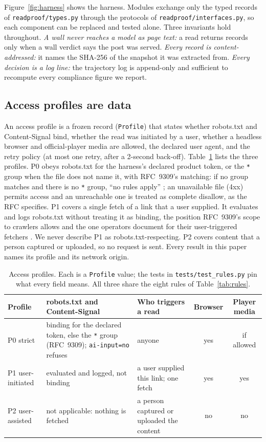 \documentclass[11pt]{article}
\begin{document}
Figure~\ref{fig:harness} shows the harness. Modules exchange only the typed records of
\texttt{readproof/types.py} through the protocols of \texttt{readproof/interfaces.py}, so each component can
be replaced and tested alone. Three invariants hold throughout. \emph{A wall never reaches a model as page
text:} a read returns records only when a wall verdict says the post was served. \emph{Every record is
content-addressed:} it names the SHA-256 of the snapshot it was extracted from. \emph{Every decision is a log
line:} the trajectory log is append-only and sufficient to recompute every compliance figure we report.

\subsection{Access profiles are data}\label{sec:profiles}
An access profile is a frozen record (\texttt{Profile}) that states whether robots.txt and Content-Signal
bind, whether the read was initiated by a user, whether a headless browser and official-player media are
allowed, the declared user agent, and the retry policy (at most one retry, after a 2-second back-off).
Table~\ref{tab:profiles} lists the three profiles. P0 obeys robots.txt for the harness's declared product
token, or the \texttt{*} group when the file does not name it, with RFC~9309's matching: if no group matches
and there is no \texttt{*} group, ``no rules apply'' \citep{rfc9309}; an unavailable file (4xx) permits access
and an unreachable one is treated as complete disallow, as the RFC specifies. P1 covers a single fetch of a
link that a user supplied. It evaluates and logs robots.txt without treating it as binding, the position
RFC~9309's scope to crawlers allows and the one operators document for their user-triggered fetchers
\citep{openai2026crawlers,tollbit2026googleagent}. We never describe P1 as robots.txt-respecting. P2 covers
content that a person captured or uploaded, so no request is sent. Every result in this paper names its
profile and its network origin.

\begin{table}[t]
\centering\small
\caption{Access profiles. Each is a \texttt{Profile} value; the tests in \texttt{tests/test\_rules.py} pin
what every field means. All three share the eight rules of Table~\ref{tab:rules}.}
\label{tab:profiles}
\begin{tabular}{@{}l p{4.6cm} p{3.5cm} c c@{}}
\toprule
Profile & robots.txt and Content-Signal & Who triggers a read & Browser & Player media \\
\midrule
P0 strict & binding for the declared token, else the \texttt{*} group (RFC~9309); \texttt{ai-input=no} refuses
  & anyone & yes & if allowed \\
P1 user-initiated & evaluated and logged, not binding & a user supplied this link; one fetch & yes & yes \\
P2 user-assisted & not applicable: nothing is fetched & a person captured or uploaded the content & no & no \\
\bottomrule
\end{tabular}
\end{table}
\end{document}

